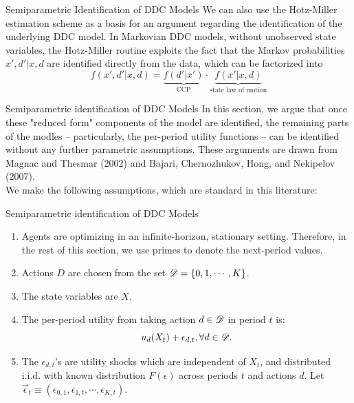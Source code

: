 \documentclass[aspectratio=169,11pt]{beamer}
\begin{document}
\begin{frame}{Semiparametric Identification of DDC Models}
\vspace{3mm}
We can also use the Hotz-Miller estimation scheme as a basis for an argument regarding the identification of the underlying DDC model. In Markovian DDC models, without unobserved state variables, the Hotz-Miller routine exploits the fact that the Markov probabilities $x', d'|x, d$ are identified directly from the data, which can be factorized into
\begin{equation}
f(x',d'|x,d) = \underbrace{f(d'|x')}_{\text{CCP}} \cdot \underbrace{f(x'|x,d)}_{\text{state law of motion}}
\end{equation}
\end{frame}

\begin{frame}{Semiparametric identification of DDC Models}
In this section, we argue that once these "reduced form" components of the model are identified, the remaining parts of the modles -- particularly, the per-period utility functions -- can be identified without any further parametric assumptions. These arguments are drawn from Magnac and Thesmar (2002) and Bajari, Chernozhukov, Hong, and Nekipelov (2007).\\
We make the following assumptions, which are standard in this literature:
\end{frame}

\begin{frame}{Semiparametric identification of DDC Models}
\begin{enumerate}
\item Agents are optimizing in an infinite-horizon, stationary setting. Therefore, in the rest of this section, we use primes to denote the next-period values. 
\item Actions $D$ are chosen from the set $\mathscr{D} = \{0,1, \cdots, K\}$.
\item The state variables are $X$.
\item The per-period utility from taking action $d \in \mathscr{D}$ in period $t$ is:
\begin{equation*}
u_d(X_t) +\epsilon_{d,t}, \forall d \in \mathscr{D}.
\end{equation*}
\item The $\epsilon_{d,t}$'s are utility shocks which are independent of $X_t$, and distributed i.i.d. with known distribution $F(\epsilon)$ across periods $t$ and actions $d$. Let $\vec \epsilon_t \equiv (\epsilon_{0,1}, \epsilon_{1,t}, \cdots, \epsilon_{K,t}).$ \\
\end{enumerate}
\end{frame}
\end{document}
